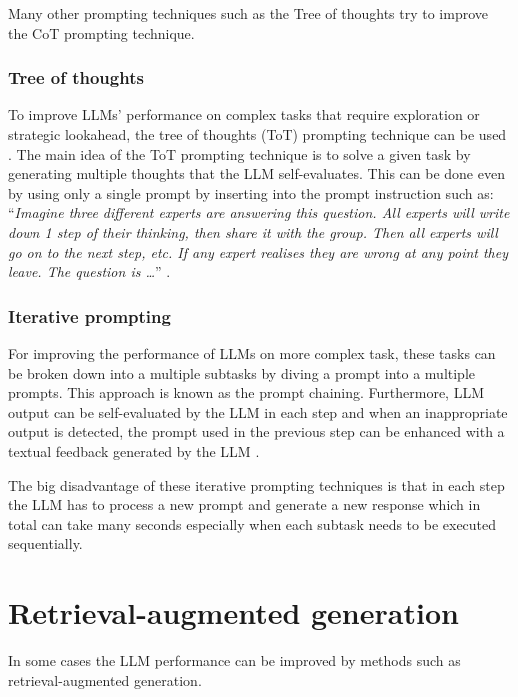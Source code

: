Many other prompting techniques such as the Tree of thoughts try to improve the CoT prompting technique.


\subsubsection{Tree of thoughts}
\label{sec:tree_of_thoughts}

To improve LLMs' performance on complex tasks that require exploration or strategic lookahead, the tree of thoughts (ToT) prompting technique can be used \cite{Long2023, Yao2024}. The main idea of the ToT prompting technique is to solve a given task by generating multiple thoughts that the LLM self-evaluates. This can be done even by using only a single prompt by inserting into the prompt instruction such as: ``\textit{Imagine three different experts are answering this question. All experts will write down 1 step of their thinking, then share it with the group. Then all experts will go on to the next step, etc. If any expert realises they are wrong at any point they leave. The question is \ldots}'' \cite{Hulbert2023}.


\subsubsection{Iterative prompting}
\label{sec:iterative_prompting}

For improving the performance of LLMs on more complex task, these tasks can be broken down into a multiple subtasks by diving a prompt into a multiple prompts. This approach is known as the prompt chaining. Furthermore, LLM output can be self-evaluated by the LLM in each step and when an inappropriate output is detected, the prompt used in the previous step can be enhanced with a textual feedback generated by the LLM \cite{Shinn2024}.

The big disadvantage of these iterative prompting techniques is that in each step the LLM has to process a new prompt and generate a new response which in total can take many seconds especially when each subtask needs to be executed sequentially.


\section{Retrieval-augmented generation}

In some cases the LLM performance can be improved by methods such as retrieval-augmented generation.

